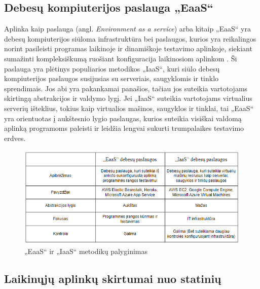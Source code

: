 \documentclass{VUMIFPSkursinis}
\begin{document}
\subsection{Debesų kompiuterijos paslauga „EaaS“}

Aplinka kaip paslauga (angl. \textit{Environment as a service}) arba kitaip 
„EaaS“ yra debesų kompiuterijos siūloma infrastruktūra bei paslaugos, kurios yra reikalingos norint pasileisti programas laikinoje ir dinamiškoje testavimo aplinkoje, siekiant sumažinti kompleksiškumą ruošiant konfiguracija laikinosiom aplinkom \cite{SaltTryliktas}. Ši paslauga yra plėtinys populiarios metodikos „IaaS“, kuri siūlo debesų kompiuterijos paslaugos susijusias su serveriais, saugyklomis ir tinklo sprendimais. Jos abi yra pakankamai panašios, tačiau jos suteikia vartotojams skirtingą abstrakcijos ir valdymo lygį. Jei „IaaS“ suteikia vartotojams virtualius serverių išteklius, tokius kaip virtualios mašinos, saugyklos ir tinklai, tai „EaaS“ yra orientuotas į aukštesnio lygio paslaugas, kurios suteikia visiškai valdomą aplinką programoms paleisti ir leidžia lengvai sukurti trumpalaikes testavimo erdves.

\begin{figure}[H]
    \centering
    \includegraphics[scale=0.9]{img/EassvsIaas.png}
    \caption{„EaaS“ ir „IaaS“ metodikų palyginimas}
    \label{img:mlp}
\end{figure}

\subsection{Laikinųjų aplinkų skirtumai nuo statinių}
\end{document}
